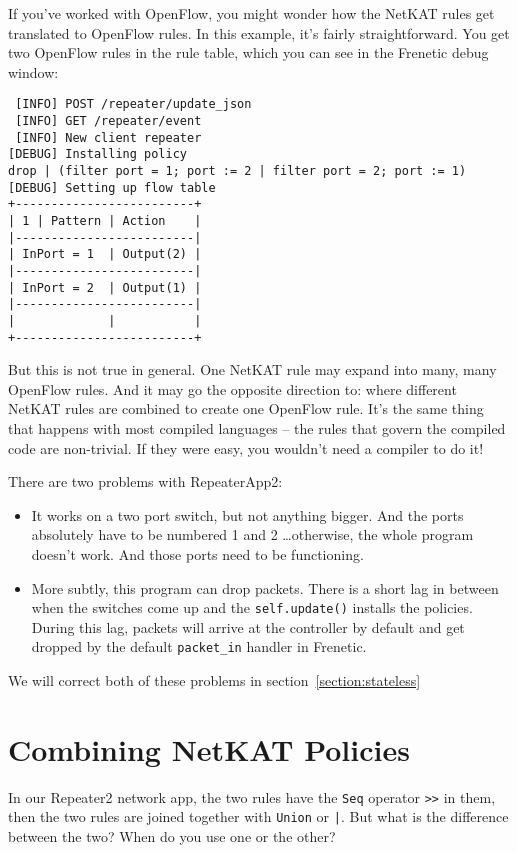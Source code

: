 If you've worked with OpenFlow, you might wonder how the NetKAT rules get translated to OpenFlow rules.
In this example, it's fairly straightforward.
You get two OpenFlow rules in the rule table, which you can see in the Frenetic debug window:

\begin{verbatim}
 [INFO] POST /repeater/update_json
 [INFO] GET /repeater/event
 [INFO] New client repeater
[DEBUG] Installing policy
drop | (filter port = 1; port := 2 | filter port = 2; port := 1)
[DEBUG] Setting up flow table
+-------------------------+
| 1 | Pattern | Action    |
|-------------------------|
| InPort = 1  | Output(2) |
|-------------------------|
| InPort = 2  | Output(1) |
|-------------------------|
|             |           |
+-------------------------+
\end{verbatim}

But this is not true in general.  
One NetKAT rule may expand into many, many OpenFlow rules.
And it may go the opposite direction to: where different NetKAT rules are combined to create one OpenFlow rule.
It's the same thing that happens with most compiled languages -- the rules that govern the compiled code
are non-trivial. 
If they were easy, you wouldn't need a compiler to do it!

There are two problems with RepeaterApp2:

\begin{itemize}
  \item It works on a two port switch, but not anything bigger.  
  And the ports absolutely have
  to be numbered 1 and 2 \ldots otherwise, the whole program doesn't work.
  And those ports need to be functioning.
  \item More subtly, this program can drop packets.  
  There is a short lag in between when the switches come up and the \texttt{self.update()} installs
  the policies. 
  During this lag, packets will arrive at the controller by default and get dropped by the 
  default \texttt{packet\_in} handler in Frenetic.   
\end{itemize}

We will correct both of these problems in section~\ref{section:stateless}

\section{Combining NetKAT Policies}
\label{section:combining}

In our Repeater2 network app, the two rules have the \texttt{Seq} operator \texttt{>>} in them, then the two rules 
are joined together with \texttt{Union} or \texttt{|}.  
But what is the difference between the two?
When do you use one or the other?

